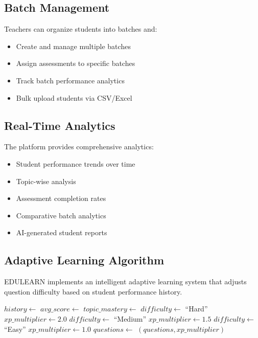 \documentclass[conference]{IEEEtran}
\begin{document}
\subsection{Batch Management}
Teachers can organize students into batches and:
\begin{itemize}
    \item Create and manage multiple batches
    \item Assign assessments to specific batches
    \item Track batch performance analytics
    \item Bulk upload students via CSV/Excel
\end{itemize}

\subsection{Real-Time Analytics}
The platform provides comprehensive analytics:
\begin{itemize}
    \item Student performance trends over time
    \item Topic-wise analysis
    \item Assessment completion rates
    \item Comparative batch analytics
    \item AI-generated student reports
\end{itemize}

\subsection{Adaptive Learning Algorithm}
EDULEARN implements an intelligent adaptive learning system that adjusts question difficulty based on student performance history.

\begin{algorithm}
\caption{Adaptive Question Difficulty Selection}
\begin{algorithmic}[1]
    \STATE $history \gets$ 
    \STATE $avg\_score \gets$ 
    \STATE $topic\_mastery \gets$ 
    \STATE
        \STATE $difficulty \gets$ ``Hard''
        \STATE $xp\_multiplier \gets 2.0$
        \STATE $difficulty \gets$ ``Medium''
        \STATE $xp\_multiplier \gets 1.5$
    \ELSE
        \STATE $difficulty \gets$ ``Easy''
        \STATE $xp\_multiplier \gets 1.0$
    \ENDIF
    \STATE
    \STATE $questions \gets$ 
    \RETURN $(questions, xp\_multiplier)$
\ENDPROCEDURE
\end{algorithmic}
\end{algorithm}
\end{document}
